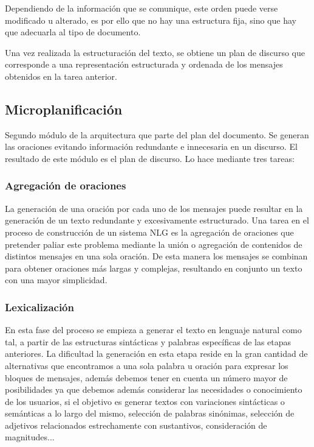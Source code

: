 Dependiendo de la información que se comunique, este orden puede verse modificado u alterado, es por ello que no hay una estructura fija, sino que hay que adecuarla al tipo de documento.

Una vez realizada la estructuración del texto, se obtiene un plan de discurso que corresponde a una representación estructurada y ordenada de los mensajes obtenidos en la tarea anterior.

\subsection{Microplanificación}
Segundo módulo de la arquitectura que parte del plan del documento. Se generan las oraciones evitando información redundante e innecesaria en un discurso. El resultado de este módulo es el plan de discurso. Lo hace mediante tres tareas:

\subsubsection{Agregación de oraciones}
La generación de una oración por cada uno de los mensajes puede resultar en la generación de un texto redundante y excesivamente estructurado. Una tarea en el proceso de construcción de un sistema NLG es la agregación de oraciones que pretender paliar este problema mediante la unión o agregación de contenidos de distintos mensajes en una sola oración. De esta manera los mensajes se combinan para obtener oraciones más largas y complejas, resultando en conjunto un texto con una mayor simplicidad.

\subsubsection{Lexicalización}
En esta fase del proceso se empieza a generar el texto en lenguaje natural como tal, a partir de las estructuras sintácticas y palabras específicas de las etapas anteriores. La dificultad  la generación en esta etapa reside en la gran cantidad de alternativas que encontramos a una sola palabra u oración para expresar los bloques de mensajes, además debemos tener en cuenta un número mayor de posibilidades ya que debemos además considerar las necesidades o conocimiento de los usuarios, si el objetivo es generar textos con variaciones sintácticas o semánticas a lo largo del mismo, selección de palabras sinónimas, selección de adjetivos relacionados estrechamente con sustantivos, consideración de magnitudes... 


